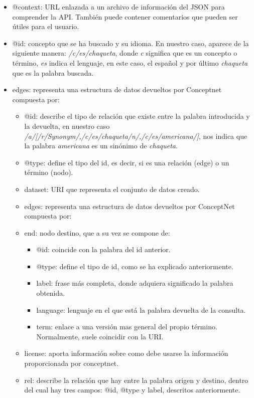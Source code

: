 \begin{itemize}
	\item @context: URL enlazada a un archivo de información del JSON para comprender la API. También puede contener comentarios que pueden ser útiles para el usuario.
	\item @id: concepto que se ha buscado y su idioma. En nuestro caso, aparece de la siguiente manera: \textit{/c/es/chaqueta}, donde  \textit{c} significa que es un concepto o término,  \textit{es} indica el lenguaje, en este caso, el español y por último \textit{chaqueta} que es la palabra buscada.
	\item edges: representa una estructura de datos devueltos por Conceptnet compuesta por:
	\begin{itemize}
		\item @id: describe el tipo de relación que existe entre la palabra introducida y la devuelta, en nuestro caso \textit{/a/[/r/Synonym/,/c/es/chaqueta/n/,/c/es/americana/]}, nos indica que la palabra \textit{americana} es un sinónimo de \textit{chaqueta}.
		\item @type: define el tipo del id, es decir, si es una relación (edge) o un término (nodo).
		\item dataset: URI que representa el conjunto de datos creado.
		\item edges: representa una estructura de datos devueltos por ConceptNet compuesta por:
		\item end: nodo destino, que a su vez se compone de:	
		\begin{itemize}
			\item @id: coincide con la palabra del id anterior.
			\item @type: define el tipo de id, como se ha explicado anteriormente.
			\item label: frase más completa, donde adquiera significado la palabra obtenida.
			\item language: lenguaje en el que está la palabra devuelta de la consulta.
			\item term: enlace a una versión mas general del propio término. Normalmente, suele coincidir con la URI.			
		\end{itemize}
		\item license: aporta información sobre como debe usarse la información proporcionada por conceptnet.
		\item rel: describe la relación que hay entre la palabra origen y destino, dentro del cual hay tres campos: @id, @type y label, descritos anteriormente.

\end{itemize}
\end{itemize}
